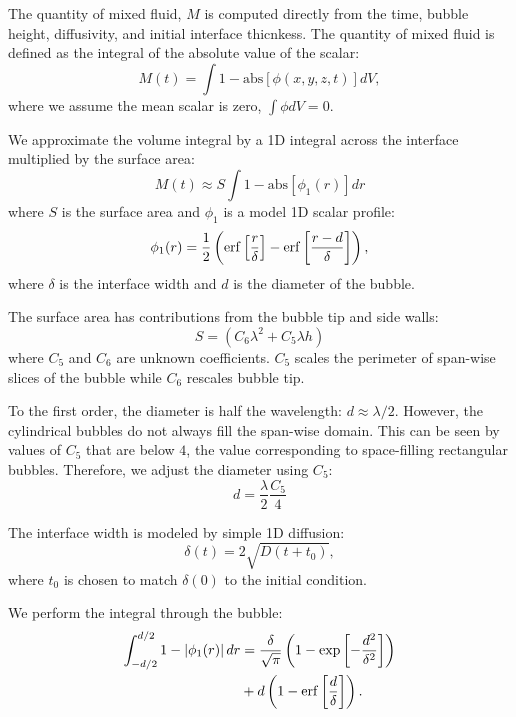 The quantity of mixed fluid, $M$ is computed directly from the time, bubble height, diffusivity, and initial interface thicnkess.
The quantity of mixed fluid is defined as the integral of the absolute value of the scalar:
\begin{equation}
M(t) = \int 1-\text{abs}\left[\phi(x,y,z,t)\right] dV,
\end{equation}
where we assume the mean scalar is zero, $\int \phi dV = 0$.

We approximate the volume integral by a 1D integral across the interface multiplied by the surface area:
\begin{equation}
M(t) \approx S \int 1- \text{abs}\left[\phi_1(r)\right] dr
\end{equation}
where $S$ is the surface area and
$\phi_1$ is a model 1D scalar profile:
\begin{equation}
\phi_1(r) = \frac{1}{2} \left( \operatorname{erf}\left[\frac{r}{\delta}\right] - \operatorname{erf}\left[\frac{r - d}{\delta}\right] \right),
\end{equation}
where $\delta$ is the interface width and
$d$ is the diameter of the bubble.

The surface area has contributions from the bubble tip and side walls:
\begin{equation}
S = \left(C_6 \lambda^2 + C_5 \lambda h\right)
\end{equation}
where $C_5$ and $C_6$ are unknown coefficients.
$C_5$ scales the perimeter of span-wise slices of the bubble while $C_6$ rescales bubble tip.

To the first order, the diameter is half the wavelength: $d \approx \lambda / 2$.
However, the cylindrical bubbles do not always fill the span-wise domain.
This can be seen by values of $C_5$ that are below $4$, the value corresponding to space-filling rectangular bubbles.
Therefore, we adjust the diameter using $C_5$:
\begin{equation}
d = \frac{\lambda}{2} \frac{C_5}{4}
\end{equation}

The interface width is modeled by simple 1D diffusion:
\begin{equation}
\delta(t) = 2 \sqrt{D (t + t_0)},
\end{equation}
where $t_0$ is chosen to match $\delta(0)$ to the initial condition.

We perform the integral through the bubble:
\begin{equation}
\begin{split}
\int_{-d/2}^{d/2} 1- \left|\phi_1(r)\right| dr &= \frac{\delta}{\sqrt{\pi}} \left( 1 - \exp\left[-\frac{d^2}{\delta^2}\right]\right) \\
&+ d \left(1 - \operatorname{erf}\left[\frac{d}{\delta}\right]\right).
\end{split}
\end{equation}



